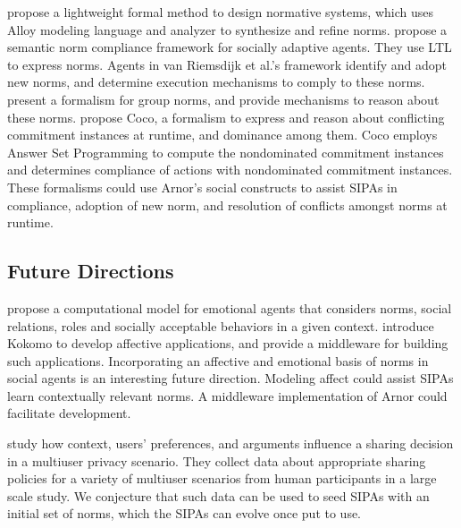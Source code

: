 \documentclass[11pt,          %
               phd,           %
               onehalfspacing %
               ]{ncsuthesis}
\makeatletter
\newcommand{\etal}{{et al.\@\xspace}}
\newcommand{\frameworkA}{Arnor\xspace}
\makeatother
\begin{document}
\citet{Hao-FSE16-Norms+formal} propose a lightweight formal
method to design normative systems, which uses Alloy modeling language
and analyzer to synthesize and refine norms. 
 propose a semantic norm
compliance framework for socially adaptive agents. They use LTL to
express norms. Agents in van Riemsdijk {\etal}'s framework identify and
adopt new norms, and determine execution mechanisms to comply to these
norms. \citet{Aldewereld-TAAS16-GroupNorms} present a
formalism for group norms, and provide mechanisms to reason about these
norms. \citet{Ajmeri-IJCAI16-Coco} propose Coco, a
formalism to express and reason about conflicting commitment instances
at runtime, and dominance among them. Coco employs Answer Set
Programming to compute the nondominated commitment instances and
determines compliance of actions with nondominated commitment instances.
These formalisms could use \frameworkA's social constructs to assist
SIPAs in compliance, adoption of new norm, and resolution of conflicts
amongst norms at runtime.

\subsection{Future Directions}

\citet{Ferreira-AAAI13-GroupRelations} propose a
computational model for emotional agents that considers norms, social
relations, roles and socially acceptable behaviors in a given context.
\citet{Sollenberger-AAMAS11-Kokomo} introduce Kokomo 
to develop affective applications, and provide a middleware for building 
such applications. 
Incorporating an affective \citep{Sollenberger-AAMAS11-Kokomo} and emotional
basis of norms in social agents is an interesting future direction.
Modeling affect could assist SIPAs learn contextually relevant norms. 
A middleware implementation of \frameworkA could facilitate development.

\citet{TOCHI-17:Multiuser} study how context, users' preferences, 
and arguments influence a sharing decision in a multiuser privacy scenario. 
They collect data about appropriate sharing policies for a variety of multiuser
scenarios from human participants in a large scale study. We conjecture that 
such data can be used to seed SIPAs with an initial set of norms, which the 
SIPAs can evolve once put to use.


\end{document}

